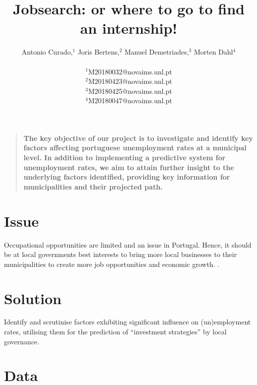 \documentclass[12pt]{article}
\title{Jobsearch: or where to go to find an internship!}
\author
{Antonio Curado,$^{1}$ Joris Bertens,$^{2}$ Manuel Demetriades,$^{3}$ Morten Dahl$^{4}$\\
\\
\normalsize{$^{1}$M20180032@novaims.unl.pt}\\
\normalsize{$^{2}$M20180423@novaims.unl.pt}\\
\normalsize{$^{3}$M20180425@novaims.unl.pt}\\
\normalsize{$^{4}$M20180047@novaims.unl.pt}\\
}
\date{}
\newenvironment{sciabstract}{%
\begin{quote} \bf}
{\end{quote}}
\begin{document}
 


\baselineskip20pt


\maketitle 




\begin{sciabstract}
  The key objective of our project is to investigate and identify key factors affecting portuguese unemployment rates at a municipal level. In addition to implementing a predictive system for unemployment rates, we aim to attain further insight to the underlying factors identified, providing key information for municipalities and their projected path. 

\end{sciabstract}



\section*{Issue}



{Occupational opportunities are limited and an issue in Portugal. Hence, it should be at local governments best interests to bring more local businesses to their municipalities to create more job opportunities and economic growth.
}.


\section*{Solution}

{Identify and scrutinise factors exhibiting significant influence on (un)employment rates, utilising them for the prediction of “investment strategies” by local governance.
}

\section*{Data}
\end{document}
